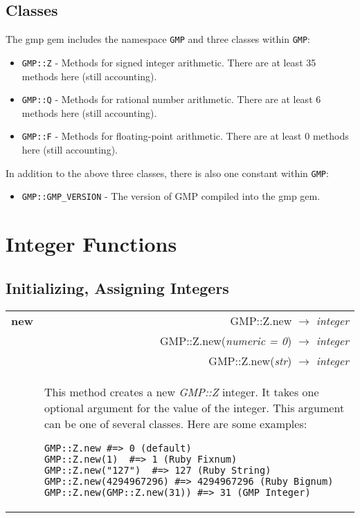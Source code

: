 \documentclass[pdftex,10pt]{article}
\newlength{\methwidth}
\newlength{\defnwidth}
\def\qquad{\quad\quad}
\def\qqqquad{\quad\quad\quad\quad}
\begin{document}
\subsection{Classes}
The gmp gem includes the namespace \texttt{GMP} and three classes within \texttt{GMP}:
\begin{itemize}
  \item \texttt{GMP::Z} - Methods for signed integer arithmetic. There are at least 35
    methods here (still accounting).
  \item \texttt{GMP::Q} - Methods for rational number arithmetic. There are at least 6
    methods here (still accounting).
  \item \texttt{GMP::F} - Methods for floating-point arithmetic. There are at least 0
    methods here (still accounting).
\end{itemize}

In addition to the above three classes, there is also one constant within \texttt{GMP}:
\begin{itemize}
  \item \texttt{GMP::GMP\_VERSION} - The version of GMP compiled into the gmp gem.
\end{itemize}

\newpage
\section{Integer Functions}

\subsection{Initializing, Assigning Integers}

\begin{tabular}{p{\methwidth} l r}
\toprule
\textbf{new} & & GMP::Z.new $\rightarrow$ \textit{integer} \\
& & GMP::Z.new(\textit{numeric = 0}) $\rightarrow$ \textit{integer} \\
& & GMP::Z.new(\textit{str}) $\rightarrow$ \textit{integer} \\
\cmidrule(r){2-3}
& \multicolumn{2}{p{\defnwidth}}{
  This method creates a new \textit{GMP::Z} integer. It takes one optional argument for
  the value of the integer. This argument can be one of several classes. Here are some
  examples:\newline
  
  \texttt{GMP::Z.new \qqqquad\qqqquad \#=> 0 (default) \newline
          GMP::Z.new(1) \qqqquad\qquad\  \#=> 1 (Ruby Fixnum) \newline
          GMP::Z.new("127") \qqqquad\  \#=> 127 (Ruby String)\newline
          GMP::Z.new(4294967296) \qquad \#=> 4294967296 (Ruby Bignum)\newline
          GMP::Z.new(GMP::Z.new(31))  \#=> 31 (GMP Integer)}
}
\end{tabular}
\newline\newline
\end{document}
